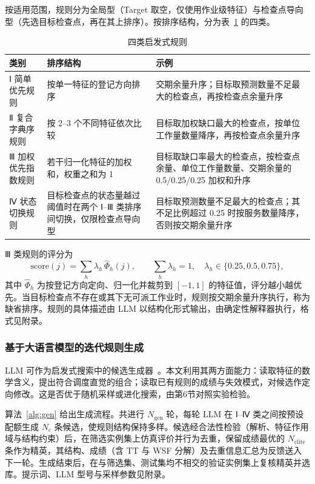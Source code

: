 \documentclass[12pt,a4paper]{article}
\begin{document}
按适用范围，规则分为全局型（Target 取空，仅使用作业级特征）与检查点导向型（先选目标检查点，再在其上排序）。按排序结构，分为表~\ref{tab:taxonomy} 的四类。

\begin{table}[t]
  \centering
  \caption{四类启发式规则}\label{tab:taxonomy}
  \small
  \begin{tabular}{@{}>{\raggedright}p{2.6cm}>{\raggedright}p{5.2cm}>{\raggedright\arraybackslash}p{6.4cm}@{}}
    \toprule
    类别 & 排序结构 & 示例 \\
    \midrule
    Ⅰ 简单优先规则 & 按单一特征的登记方向排序 & 交期余量升序；目标取预测数量不足最大的检查点，再按检查点余量升序 \\
    Ⅱ 复合字典序规则 & 按 2--3 个不同特征依次比较 & 目标取加权缺口最大的检查点，按单位工作量数量降序，再按检查点余量升序 \\
    Ⅲ 加权优先指数规则 & 若干归一化特征的加权和，权重之和为 1 & 目标取缺口率最大的检查点，按检查点余量、单位工作量数量、交期余量的 0.5/0.25/0.25 加权和升序 \\
    Ⅳ 状态切换规则 & 目标检查点的状态量越过阈值时在两个 Ⅰ--Ⅲ 类排序间切换，仅限检查点导向型 & 目标取预测数量不足最大的检查点；其不足比例超过 0.25 时按服务数量降序，否则按交期余量升序 \\
    \bottomrule
  \end{tabular}
\end{table}

Ⅲ 类规则的评分为
\begin{equation}\label{eq:score}
  \mathrm{score}(j)=\sum_{h}\lambda_h\,\hat\Phi_h(j),\qquad \sum_h\lambda_h=1,\quad \lambda_h\in\{0.25,0.5,0.75\},
\end{equation}
其中 $\hat\Phi_h$ 为按登记方向定向、归一化并裁剪到 $[-1,1]$ 的特征值，评分越小越优先。当目标检查点不存在或其下无可派工作业时，规则按交期余量升序执行，称为缺省排序。规则的具体描述由 LLM 以结构化形式输出，由确定性解释器执行，格式见附录。

\subsubsection{基于大语言模型的迭代规则生成}

LLM 可作为启发式搜索中的候选生成器~\cite{romera2024funsearch,liu2024eoh}。本文利用其两方面能力：读取特征的数学含义，提出符合调度直觉的组合；读取已有规则的成绩与失效模式，对候选作定向修改。这是否优于随机采样或进化搜索，由第6节对照实验检验。

算法~\ref{alg:gen} 给出生成流程。共进行 $N_{\mathrm{gen}}$ 轮，每轮 LLM 在 Ⅰ--Ⅳ 类之间按预设配额生成 $N_c$ 条候选，使规则结构保持多样。候选经合法性检验（解析、特征作用域与结构约束）后，在筛选实例集上仿真评价并行为去重，保留成绩最优的 $N_{\mathrm{elite}}$ 条作为精英，其结构、成绩（含 TT 与 WSF 分解）及去重信息汇总为反馈送入下一轮。生成结束后，在与筛选集、测试集均不相交的验证实例集上复核精英并选库。提示词、LLM 型号与采样参数见附录。
\end{document}
